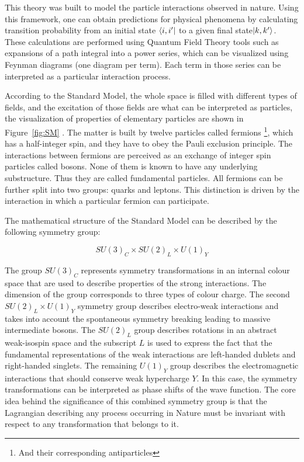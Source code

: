 This theory was built to model the particle interactions observed in nature. Using this framework, one can obtain predictions for physical phenomena by calculating transition probability from an initial state $\langle i, i'\rvert$ to a given final state$\lvert k, k' \rangle$. These calculations are performed using Quantum Field Theory tools such as expansions of a path integral into a power series, which can be visualized using Feynman diagrams (one diagram per term). Each term in those series can be interpreted as a particular interaction process. 

According to the Standard Model, the whole space is filled with different types of fields, and the excitation of those fields are what can be interpreted as particles, the visualization of properties of elementary particles are shown in Figure~\ref{fig:SM} . The matter is built by twelve particles called fermions \footnote{And their corresponding antiparticles}, which has a half-integer spin, and they have to obey the Pauli exclusion principle. The interactions between fermions are perceived as an exchange of integer spin particles called bosons. 
None of them is known to have any underlying substructure. Thus they are called fundamental particles.
All fermions can be further split into two groups: quarks and leptons. This distinction is driven by the interaction in which a particular fermion can participate. 


The mathematical structure of the Standard Model can be described by the following symmetry group:

\begin{equation}
    SU(3)_C \times SU(2)_L \times U(1)_Y
\end{equation}

The group $SU(3)_C$ represents symmetry transformations in an internal colour space that are used to describe properties of the strong interactions. The dimension of the group corresponds to three types of colour charge. The second $SU(2)_L \times U(1)_Y$ symmetry group describes electro-weak interactions and takes into account the spontaneous symmetry breaking leading to massive intermediate bosons. The $SU(2)_L$ group describes rotations in an abstract weak-isospin space and the subscript $L$ is used to express the fact that the fundamental representations of the weak interactions are left-handed dublets and right-handed singlets. The remaining $U(1)_Y$ group describes the electromagnetic interactions that should conserve weak hypercharge $Y$. In this case, the symmetry transformations can be interpreted as phase shifts of the wave function. The core idea behind the significance of this combined symmetry group is that the Lagrangian describing any process occurring in Nature must be invariant with respect to any transformation that belongs to it.

